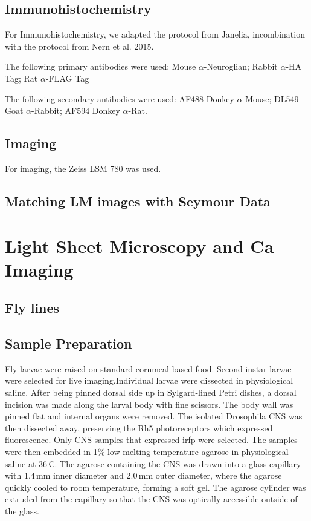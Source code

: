 \subsection{Immunohistochemistry}
For Immunohistochemistry, we adapted the protocol from Janelia, incombination with the protocol from Nern et al. 2015.

The following primary antibodies were used: Mouse $\alpha$-Neuroglian; Rabbit $\alpha$-HA Tag; Rat $\alpha$-FLAG Tag

The following secondary antibodies were used: AF488 Donkey $\alpha$-Mouse; DL549 Goat $\alpha$-Rabbit;
AF594 Donkey $\alpha$-Rat.



\subsection{Imaging}
For imaging, the Zeiss LSM 780 was used.

\subsection{Matching LM images with Seymour Data} %
\newpage




\section{Light Sheet Microscopy and Ca Imaging}

\subsection{Fly lines} %

\subsection{Sample Preparation}
Fly larvae were raised on standard cornmeal-based food.
Second instar larvae were selected for live imaging.Individual larvae were dissected in physiological saline.%
After being pinned dorsal side up in Sylgard-lined Petri dishes, a dorsal incision was made along the larval body with fine scissors. The body wall was pinned flat and internal organs were removed. The isolated Drosophila CNS was then dissected away, preserving the Rh5 photoreceptors which expressed fluorescence.  Only CNS samples that expressed irfp were selected.%
The samples were then embedded in 1\% low-melting temperature agarose in physiological saline at 36\,\textdegree{}C. The agarose containing the CNS was drawn into a glass capillary with 1.4\,mm inner diameter and 2.0\,mm outer diameter, where the agarose quickly cooled to room temperature, forming a soft gel. The agarose cylinder was extruded from the capillary so that the CNS was optically accessible outside of the glass. %



